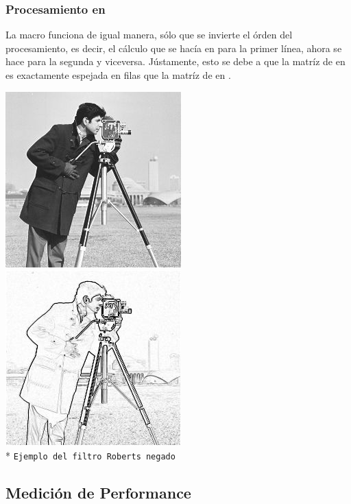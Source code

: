 \subsubsection{Procesamiento en }
	La macro  funciona de igual manera, sólo que se invierte el órden del procesamiento, es decir, el cálculo que se hacía en 
 para la primer línea, ahora se hace para la segunda y viceversa. Jústamente, esto se debe a que la matríz de  en
 es exactamente espejada en filas que la matríz de  en .

\vspace{1.0cm}
\begin{center}
\includegraphics[scale=0.5]{imgs/cameraman.jpg}
\includegraphics[scale=0.5]{imgs/cameraman-roberts-neg.jpg} \\*
\texttt{\small Ejemplo del filtro Roberts negado }\\
\end{center}

\pagebreak
\subsection{Medición de Performance}

